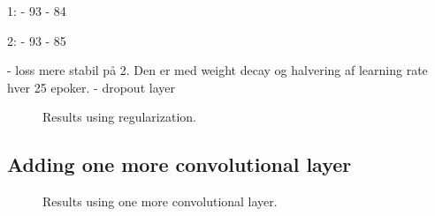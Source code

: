 1:
- 93%
- 84%

2:
- 93%
- 85%

- loss mere stabil på 2. Den er med weight decay og halvering af learning rate hver 25 epoker.
- dropout layer

\begin{figure}[H]
    \vspace*{-0.7cm}
    \centering
    \hspace{1cm}
    \caption{Results using regularization.}
    \label{fig:reg}
    \vspace*{-0.7cm}
\end{figure}

\subsection{Adding one more convolutional layer}
\begin{figure}[H]
    \vspace*{-0.7cm}
    \centering
    \hspace{1cm}
    \caption{Results using one more convolutional layer.}
    \label{fig:reg}
    \vspace*{-0.7cm}
\end{figure}